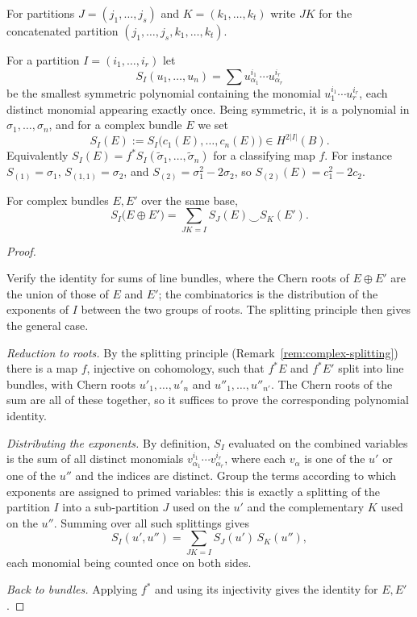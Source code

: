 For partitions $J=(j_1,\dots,j_s)$ and $K=(k_1,\dots,k_t)$ write $JK$ for the
concatenated partition $(j_1,\dots,j_s,k_1,\dots,k_t)$.

\begin{definition}
For a partition $I=(i_1,\dots,i_r)$ let
\[
S_I(u_1,\dots,u_n)=\sum u_{\alpha_1}^{i_1}\cdots u_{\alpha_r}^{i_r}
\]
be the smallest symmetric polynomial containing the monomial
$u_1^{i_1}\cdots u_r^{i_r}$, each distinct monomial appearing exactly once.
Being symmetric, it is a polynomial in $\sigma_1,\dots,\sigma_n$, and for a
complex bundle $E$ we set
\[
S_I(E):=S_I\big(c_1(E),\dots,c_n(E)\big)\in H^{2|I|}(B).
\]
Equivalently $S_I(E)=f^*S_I(\tilde\sigma_1,\dots,\tilde\sigma_n)$ for a
classifying map $f$. For instance $S_{(1)}=\sigma_1$,
$S_{(1,1)}=\sigma_2$, and $S_{(2)}=\sigma_1^2-2\sigma_2$, so
$S_{(2)}(E)=c_1^2-2c_2$.
\end{definition}

\begin{theorem}\label{thm:SI-sum}
For complex bundles $E,E'$ over the same base,
\[
S_I\big(E\oplus E'\big)=\sum_{JK=I}S_J(E)\smile S_K(E').
\]
\end{theorem}

\begin{proof}
\begin{strategy}
Verify the identity for sums of line bundles, where the Chern roots of
$E\oplus E'$ are the union of those of $E$ and $E'$; the combinatorics is the
distribution of the exponents of $I$ between the two groups of roots. The
splitting principle then gives the general case.
\end{strategy}

 \emph{Reduction to roots.} By the splitting principle
(Remark~\ref{rem:complex-splitting}) there is a map $f$, injective on cohomology,
such that $f^*E$ and $f^*E'$ split into line bundles, with Chern roots
$u'_1,\dots,u'_n$ and $u''_1,\dots,u''_{n'}$. The Chern roots of the sum are all
of these together, so it suffices to prove the corresponding polynomial identity.

 \emph{Distributing the exponents.} By definition, $S_I$ evaluated on
the combined variables is the sum of all distinct monomials
$v_{\alpha_1}^{i_1}\cdots v_{\alpha_r}^{i_r}$, where each $v_{\alpha}$ is one of
the $u'$ or one of the $u''$ and the indices are distinct. Group the terms
according to which exponents are assigned to primed variables: this is exactly a
splitting of the partition $I$ into a sub-partition $J$ used on the $u'$ and the
complementary $K$ used on the $u''$. Summing over all such splittings gives
\[
S_I(u',u'')=\sum_{JK=I}S_J(u')\,S_K(u''),
\]
each monomial being counted once on both sides.

 \emph{Back to bundles.} Applying $f^*$ and using its injectivity gives
the identity for $E,E'$.
\end{proof}

